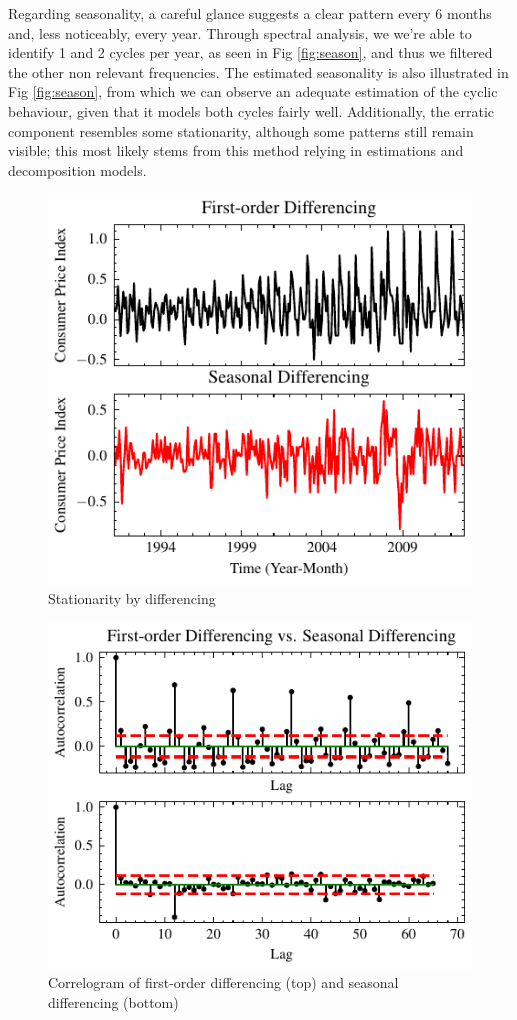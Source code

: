 \documentclass[conference]{IEEEtran}
\begin{document}
Regarding seasonality, a careful glance suggests a clear pattern every 6 months and, less noticeably, every year. Through spectral analysis, we we're able to identify 1 and 2 cycles per year, as seen in Fig \ref{fig:season}, and thus we filtered the other non relevant frequencies. The estimated seasonality is also illustrated in Fig \ref{fig:season}, from which we can observe an adequate estimation of the cyclic behaviour, given that it models both cycles fairly well. Additionally, the erratic component resembles some stationarity, although some patterns still remain visible; this most likely stems from this method relying in estimations and decomposition models.

\begin{figure}[hbtp]
    \centering
    \includegraphics{../figs/differencing.pdf}
    \caption{Stationarity by differencing}
    \label{fig:differencing}
\end{figure}

\begin{figure}[hbtp]
    \centering
    \includegraphics{../figs/acs_diff.pdf}
    \caption{Correlogram of first-order differencing (top) and seasonal differencing (bottom)}
    \label{fig:acs_diff}
\end{figure}
\end{document}
